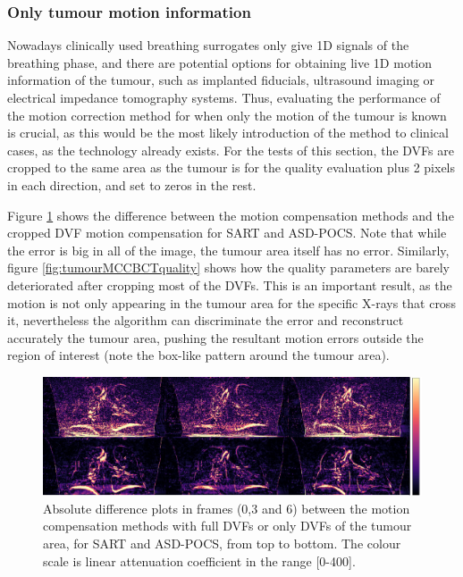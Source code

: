\subsubsection{Only tumour motion information}

Nowadays clinically used breathing surrogates only give 1D signals of the breathing phase, and there are potential options for obtaining live 1D motion information of the tumour, such as implanted fiducials, ultrasound imaging\cite{western2015ultrasound} or electrical impedance tomography\cite{song2009non}\cite{pengpan2010motion} systems. Thus, evaluating the performance of the motion correction method for when only the motion of the tumour is known is crucial, as this would be the most likely introduction of the method to clinical cases, as the technology already exists. For the tests of this section, the DVFs are cropped to the same area as the tumour is for the quality evaluation plus 2 pixels in each direction, and set to zeros in the rest.

Figure \ref{fig:tumourMCCBCT3static} shows the difference between the motion compensation methods and the cropped DVF motion compensation for SART and ASD-POCS. Note that while the error is big in all of the image, the tumour area itself has no error. Similarly, figure \ref{fig:tumourMCCBCTquality} shows how the quality parameters are barely deteriorated after cropping most of the DVFs. This is an important result, as the motion is not only appearing in the tumour area for the specific X-rays that cross it, nevertheless the algorithm can discriminate the error and reconstruct accurately the tumour area, pushing the resultant motion errors outside the region of interest (note the box-like pattern around the tumour area).



\begin{figure}
\begin{center}

\includegraphics[width=\textwidth]{accuracyMC/difftumourMCCBCT3stage.png} 


\end{center}

\caption[Three difference frames of the  motion compensation methods with DVFs only in the tumour]{\label{fig:tumourMCCBCT3static} Absolute difference plots in frames (0,3 and 6) between the motion compensation methods with full DVFs or only DVFs of the tumour area, for SART and ASD-POCS, from top to bottom.  The colour scale is linear attenuation coefficient in the range [0-400].} 

\end{figure}


